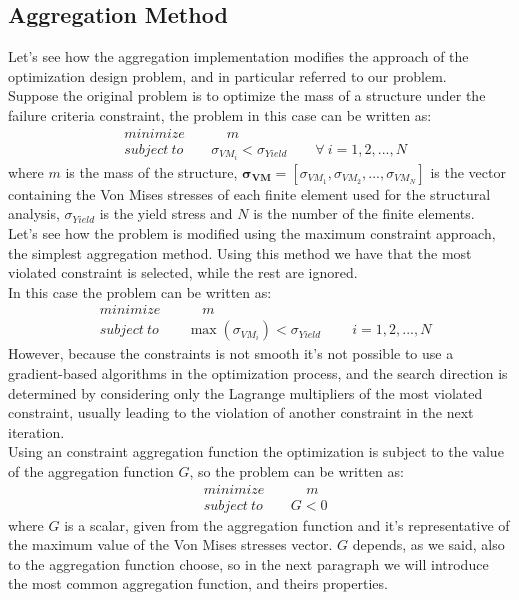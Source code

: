 \subsection{Aggregation Method}
Let's see how the aggregation implementation modifies the approach of the optimization design problem, and in particular referred to our problem. \\
Suppose the original problem is to optimize the mass of a structure under the failure criteria constraint, the problem in this case can be written as:
\begin{align*}
&minimize \qquad \quad m\\
&subject\ to \qquad  \sigma_{VM_i}< \sigma_{Yield}\qquad \forall \ i=1,2,...,N
\end{align*}
where $m$ is the mass of the structure, $\mathbf{\sigma_{VM}} =[\sigma_{VM_1},\sigma_{VM_2},...,\sigma_{VM_N}]$ is the vector containing the Von Mises stresses of each finite element used for the structural analysis, $\sigma_{Yield}$ is the yield stress and $N$ is the number of the finite elements.\\
Let's see how the problem is modified using the maximum constraint approach, the simplest aggregation method. Using this method we have that the most violated constraint is selected, while the rest are ignored. \\In this case the problem can be written as:
\begin{align*}
&minimize \qquad \quad m\\
&subject\ to \qquad  \max (\sigma_{VM_i})< \sigma_{Yield}\qquad  \ i=1,2,...,N
\end{align*}
However, because the constraints is not smooth it's not possible to use a gradient-based algorithms in the optimization process, and the search direction is determined by considering only the Lagrange multipliers of the most violated constraint, usually leading to the violation of another constraint in the next iteration.\\
Using an constraint aggregation function the optimization is subject to the value of the aggregation function $G$, so the problem can be written as:
\begin{align*}
&minimize \qquad \quad m\\
&subject\ to \qquad  G < 0
\end{align*}
where $G$ is a scalar, given from the aggregation function and it's representative of the maximum value of the Von Mises stresses vector. $G$ depends, as we said, also to the aggregation function choose, so in the next paragraph we will introduce the most common aggregation function, and theirs properties.
